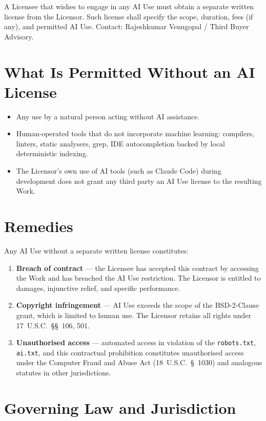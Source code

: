 \documentclass[11pt]{article}
\begin{document}
A Licensee that wishes to engage in any AI Use must obtain a
separate written license from the Licensor.  Such license shall
specify the scope, duration, fees (if any), and permitted AI Use.
Contact: Rajeshkumar Venugopal / Third Buyer Advisory.

\section{What Is Permitted Without an AI License}

\begin{itemize}[leftmargin=2em]
\item Any use by a natural person acting without AI assistance.
\item Human-operated tools that do not incorporate machine learning:
  compilers, linters, static analysers, grep, IDE autocompletion
  backed by local deterministic indexing.
\item The Licensor's own use of AI tools (such as Claude Code)
  during development does not grant any third party an AI Use
  license to the resulting Work.
\end{itemize}

\section{Remedies}

Any AI Use without a separate written license constitutes:

\begin{enumerate}[leftmargin=2em]
\item \textbf{Breach of contract} --- the Licensee has accepted
  this contract by accessing the Work and has breached the AI Use
  restriction.  The Licensor is entitled to damages, injunctive
  relief, and specific performance.
\item \textbf{Copyright infringement} --- AI Use exceeds the scope
  of the BSD-2-Clause grant, which is limited to human use.  The
  Licensor retains all rights under 17~U.S.C.\ \S\S~106, 501.
\item \textbf{Unauthorised access} --- automated access in
  violation of the \texttt{robots.txt}, \texttt{ai.txt}, and this
  contractual prohibition constitutes unauthorised access under
  the Computer Fraud and Abuse Act (18~U.S.C.\ \S~1030) and
  analogous statutes in other jurisdictions.
\end{enumerate}

\section{Governing Law and Jurisdiction}
\end{document}
